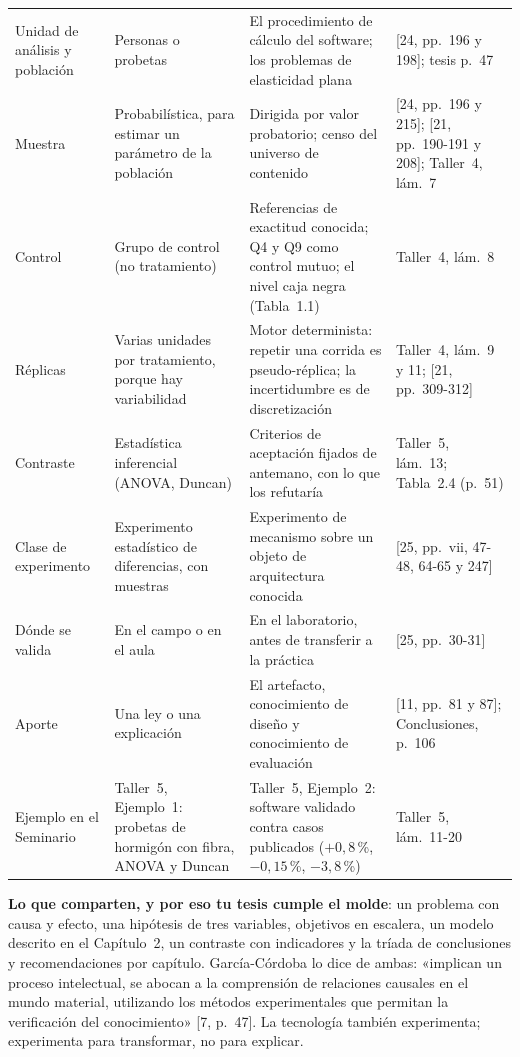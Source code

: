 \documentclass[11pt,a4paper]{article}
\begin{document}
{\begin{longtable}{@{}L{2.4cm}L{4.05cm}L{4.95cm}L{3.9cm}@{}}
Unidad de análisis y población & Personas o probetas & El procedimiento de cálculo del software; los problemas de elasticidad plana & [24, pp.~196 y 198]; tesis p.~47\\
Muestra & Probabilística, para estimar un parámetro de la población & Dirigida por valor probatorio; censo del universo de contenido & [24, pp.~196 y 215]; [21, pp.~190-191 y 208]; Taller~4, lám.~7\\
Control & Grupo de control (no tratamiento) & Referencias de exactitud conocida; Q4 y Q9 como control mutuo; el nivel caja negra (Tabla~1.1) & Taller~4, lám.~8\\
Réplicas & Varias unidades por tratamiento, porque hay variabilidad & Motor determinista: repetir una corrida es pseudo-réplica; la incertidumbre es de discretización & Taller~4, lám.~9 y 11; [21, pp.~309-312]\\
Contraste & Estadística inferencial (ANOVA, Duncan) & Criterios de aceptación fijados de antemano, con lo que los refutaría & Taller~5, lám.~13; Tabla~2.4 (p.~51)\\
Clase de experimento & Experimento estadístico de diferencias, con muestras & Experimento de mecanismo sobre un objeto de arquitectura conocida & [25, pp.~vii, 47-48, 64-65 y 247]\\
Dónde se valida & En el campo o en el aula & En el laboratorio, antes de transferir a la práctica & [25, pp.~30-31]\\
Aporte & Una ley o una explicación & El artefacto, conocimiento de diseño y conocimiento de evaluación & [11, pp.~81 y 87]; Conclusiones, p.~106\\
Ejemplo en el Seminario & Taller~5, Ejemplo~1: probetas de hormigón con fibra, ANOVA y Duncan & Taller~5, Ejemplo~2: software validado contra casos publicados ($+0{,}8$\,\%, $-0{,}15$\,\%, $-3{,}8$\,\%) & Taller~5, lám.~11-20\\
\end{longtable}}

\textbf{Lo que comparten, y por eso tu tesis cumple el molde}: un problema con causa y efecto, una hipótesis de tres variables, objetivos en escalera, un modelo descrito en el Capítulo~2, un contraste con indicadores y la tríada de conclusiones y recomendaciones por capítulo. García-Córdoba lo dice de ambas: «implican un proceso intelectual, se abocan a la comprensión de relaciones causales en el mundo material, utilizando los métodos experimentales que permitan la verificación del conocimiento» [7, p.~47]. La tecnología también experimenta; experimenta para transformar, no para explicar.
\end{document}
